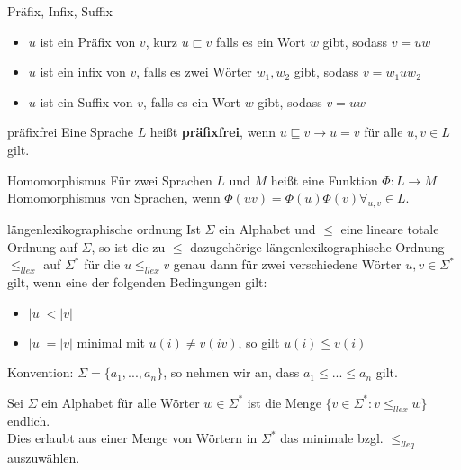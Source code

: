 
\begin{defn}{Präfix, Infix, Suffix}
    \begin{itemize}
        \item $u$ ist ein Präfix von $v$, kurz $u \sqsubset v$ falls es ein Wort $w$ gibt, sodass $v=uw$
        \item $u$ ist ein infix von $v$,  falls es zwei Wörter $w_1,w_2$ gibt, sodass $v=w_1uw_2$
        \item $u$ ist ein Suffix von $v$, falls es ein Wort $w$ gibt, sodass $v=uw$
    \end{itemize}
\end{defn}

\begin{defn}{präfixfrei}
    Eine Sprache $L$ heißt \textbf{präfixfrei}, wenn $u \sqsubseteq v \rightarrow u = v$ für alle $u,v \in L$ gilt.
\end{defn}

\begin{defn}{Homomorphismus}
    Für zwei Sprachen $L$ und $M$ heißt eine Funktion $\Phi :L\rightarrow M$ Homomorphismus von Sprachen, wenn $\Phi(uv) = \Phi(u)\Phi(v) \forall_{u,v} \in L$.
\end{defn}

\begin{defn}{längenlexikographische ordnung}
    Ist $\Sigma$ ein Alphabet und $\leq$ eine lineare totale Ordnung auf $\Sigma$, so ist die zu $\leq$ dazugehörige längenlexikographische Ordnung $\leq_{llex}$ auf $\Sigma^*$ für die $u \leq_{llex} v$ genau dann für zwei verschiedene Wörter $u,v \in \Sigma^*$ gilt, wenn eine der folgenden Bedingungen gilt:
    \begin{itemize}
        \item $|u| < |v|$ 
        \item $|u| = |v|$ minimal mit $u(i) \neq v(iv)$, so gilt $u(i) \leqq v(i)$
    \end{itemize}
    Konvention: $\Sigma = \{a_1,...,a_n\}$, so nehmen wir an, dass $a_1\leq...\leq a_n$ gilt.
\end{defn}

\begin{bem}
    Sei $\Sigma$ ein Alphabet für alle Wörter $w \in \Sigma^*$ ist die Menge $\{v \in \Sigma^*:v\leq_{llex}w\}$ endlich. \\
    Dies erlaubt aus einer Menge von Wörtern in $\Sigma^*$ das minimale bzgl. $\leq_{lleq}$ auszuwählen.
\end{bem}


